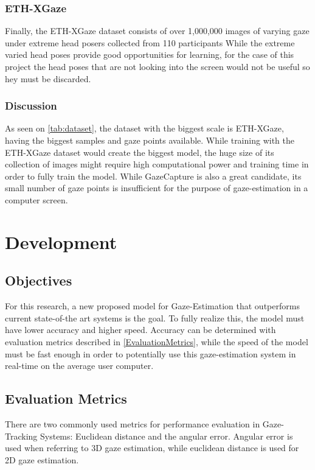 \subsection{ETH-XGaze}
Finally, the ETH-XGaze dataset \cite{Zhang2020ETHXGaze} consists of over 1,000,000 images of varying gaze under extreme head posers collected from 110 participants While the extreme varied head poses provide good opportunities for learning, for the case of this project the head poses that are not looking into the screen would not be useful so hey must be discarded.

\subsection{Discussion}
As seen on \autoref{tab:dataset}, the dataset with the biggest scale is ETH-XGaze, having the biggest samples and gaze points available. 
While training with the ETH-XGaze dataset would create the biggest model, the huge size of its collection of images might require high computational
power and training time in order to fully train the model. While GazeCapture is also a great candidate, its small number of gaze points 
is insufficient for the purpose of gaze-estimation in a computer screen.

\chapter{Development}
\label{Chap3}


\section{Objectives}
For this research, a new proposed model for Gaze-Estimation that outperforms current state-of-the art systems is 
the goal. To fully realize this, the model must have lower accuracy and higher speed.
Accuracy can be determined with evaluation metrics described in \autoref{EvaluationMetrics}, while the speed of the model
must be fast enough in order to potentially use this gaze-estimation system in real-time on the average user computer.

\section{Evaluation Metrics}
\label{EvaluationMetrics}
There are two commonly used metrics for performance evaluation in Gaze-Tracking Systems:
Euclidean distance and the angular error. Angular error is used when referring to 3D gaze estimation, while euclidean distance is used for 2D gaze estimation.

